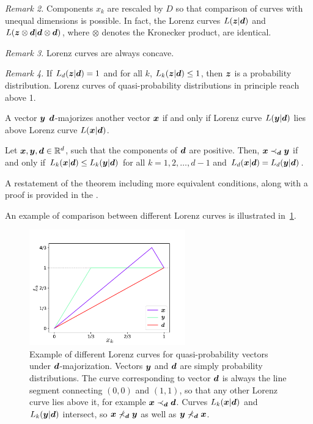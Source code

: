 \documentclass[pra,
aps,
twocolumn,
superscriptaddress,
groupedaddress,
nofootinbib,
reprint
]{revtex4-1}
\begin{document}
\emph{Remark 2.} Components $x_k$ are rescaled by $D$ so that comparison of curves with unequal dimensions is possible.
In fact, the Lorenz curves $L(\bm{z}|\bm{d})$ and $L(\bm{z} \otimes \bm{d}|\bm{d} \otimes \bm{d})$, where $\otimes$ denotes the Kronecker product, are identical.

\emph{Remark 3.} Lorenz curves are always concave.

\emph{Remark 4.} If $L_d(\bm{z}|\bm{d}) = 1$ and for all $k$, $L_k(\bm{z}|\bm{d}) \leq 1$, then $\bm{z}$ is a probability distribution.
Lorenz curves of quasi-probability distributions in principle reach above 1.

A vector $\bm{y}$ $\bm{d}$-majorizes another vector $\bm{x}$  if and only if Lorenz curve $L(\bm{y}|\bm{d})$ lies above Lorenz curve $L(\bm{x}|\bm{d})$.
\begin{theorem}\label{thm:dmajor}
    Let $\bm{x}, \bm{y}, \bm{d} \in \mathbb{R}^d$, such that the components of $\bm{d}$ are positive. 
    Then, $\bm{x} \prec_{\bm{d}} \bm{y}$ if and only if $L_k(\bm{x}|\bm{d}) \leq L_k(\bm{y}|\bm{d})$ for all $k=1,2,\dots, d-1$ and $L_d(\bm{x}|\bm{d}) = L_d(\bm{y}|\bm{d})$.
\end{theorem}
A restatement of the theorem including more equivalent conditions, along with a proof is provided in the .

An example of comparison between different Lorenz curves is illustrated in~\cref{fig:lctoy}.
\begin{figure}
    \centering
    \includegraphics[height=5cm]{figs/lctoy.pdf}
    \caption{Example of different Lorenz curves for quasi-probability vectors under $\bm{d}$-majorization.
    Vectors $\bm{y}$ and $\bm{d}$ are simply probability distributions.
    The curve corresponding to vector $\bm{d}$ is always the line segment connecting $(0,0)$ and $(1,1)$, so that any other Lorenz curve lies above it, for example $\bm{x} \prec_{\bm{d}} \bm{d}$.
    Curves $L_k(\bm{x}|\bm{d})$ and $L_k(\bm{y}|\bm{d})$ intersect, so $\bm{x} \nprec_{\bm{d}} \bm{y}$ as well as $\bm{y} \nprec_{\bm{d}} \bm{x}$.
    }
    \label{fig:lctoy}
\end{figure}
\end{document}

